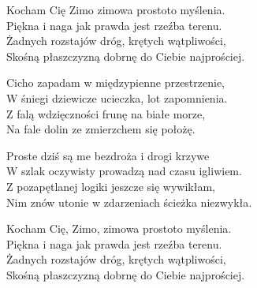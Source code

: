 \begin{textn}
    \begin{footTwo}
    \hfill\break
    \hfill\break
Kocham Cię Zimo zimowa prostoto myślenia.\\
Piękna i naga jak prawda jest rzeźba terenu.\\
Żadnych rozstajów dróg, krętych wątpliwości,\\
Skośną płaszczyzną dobrnę do Ciebie najprościej.

Cicho zapadam w międzypienne przestrzenie,\\
W śniegi dziewicze ucieczka, lot zapomnienia.\\
Z falą wdzięczności frunę na białe morze,\\
Na fale dolin ze zmierzchem się położę.

Proste dziś są me bezdroża i drogi krzywe\\
W szlak oczywisty prowadzą nad czasu igliwiem.\\
Z pozapętlanej logiki jeszcze się wywikłam,\\
Nim znów utonie w zdarzeniach ścieżka niezwykła.

Kocham Cię, Zimo, zimowa prostoto myślenia.\\
Piękna i naga jak prawda jest rzeźba terenu.\\
Żadnych rozstajów dróg, krętych wątpliwości,\\
Skośną płaszczyzną dobrnę do Ciebie najprościej.
\end{footTwo}
\end{textn}
